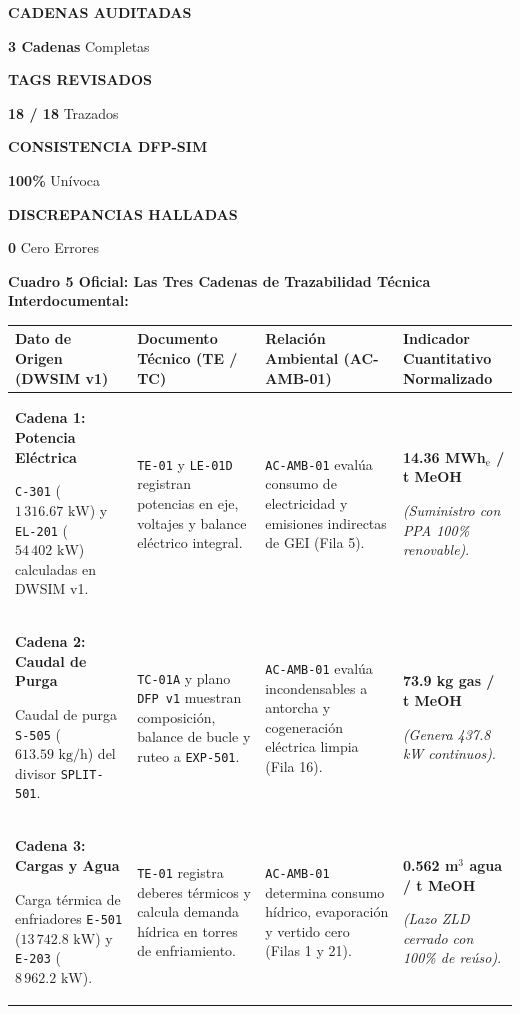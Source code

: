 \documentclass[10pt,landscape]{article}
\newcommand{\metriccard}[4]{%
  \begin{tcolorbox}[
    width=#1,
    colback=white,
    colframe=#3!70!black,
    arc=1.8mm,
    boxrule=0.8pt,
    top=3pt,
    bottom=3pt,
    left=4pt,
    right=4pt,
    nobeforeafter
  ]
    \centering
    {\fontsize{6.0pt}{7.2pt}\selectfont \textbf{\color{navyblue}#2}}\par
    \vspace{1.5pt}
    {\color{#3}#4}
  \end{tcolorbox}%
}
\begin{document}
\noindent
\begin{minipage}{\textwidth}
  \centering
  \metriccard{0.235\textwidth}{CADENAS AUDITADAS}{navyblue}{\textbf{\Huge 3 Cadenas} Completas} \hfill
  \metriccard{0.235\textwidth}{TAGS REVISADOS}{emeraldgreen}{\textbf{\Huge 18 / 18} Trazados} \hfill
  \metriccard{0.235\textwidth}{CONSISTENCIA DFP-SIM}{emeraldgreen}{\textbf{\Huge 100\%} Unívoca} \hfill
  \metriccard{0.235\textwidth}{DISCREPANCIAS HALLADAS}{emeraldgreen}{\textbf{\Huge 0} Cero Errores}
\end{minipage}

\vspace{2.5pt}

\noindent\textbf{\fontsize{8.2pt}{9.5pt}\selectfont \color{navyblue}Cuadro 5 Oficial: Las Tres Cadenas de Trazabilidad Técnica Interdocumental:}\par\vspace{1pt}

\scriptsize
\renewcommand{\arraystretch}{1.22}
\begin{tabularx}{\textwidth}{p{3.6cm} p{3.8cm} p{4.6cm} X}
  \toprule
  \rowcolor{tableheader}
  \textbf{\color{white}Dato de Origen (DWSIM v1)} & \textbf{\color{white}Documento Técnico (TE / TC)} & \textbf{\color{white}Relación Ambiental (AC-AMB-01)} & \textbf{\color{white}Indicador Cuantitativo Normalizado} \\
  \midrule
  \rowcolor{roweven}
  \textbf{\color{navyblue}Cadena 1: Potencia Eléctrica}\par
  \texttt{C-301} ($1\,316.67\text{ kW}$) y \texttt{EL-201} ($54\,402\text{ kW}$) calculadas en DWSIM v1. &
  \texttt{TE-01} y \texttt{LE-01D} registran potencias en eje, voltajes y balance eléctrico integral. &
  \texttt{AC-AMB-01} evalúa consumo de electricidad y emisiones indirectas de GEI (Fila 5). &
  \textbf{\Large 14.36 MWh$_{\text{e}}$ / t MeOH}\par
  \textit{(Suministro con PPA 100\% renovable)}. \\
  \midrule
  \rowcolor{rowodd}
  \textbf{\color{navyblue}Cadena 2: Caudal de Purga}\par
  Caudal de purga \texttt{S-505} ($613.59\text{ kg/h}$) del divisor \texttt{SPLIT-501}. &
  \texttt{TC-01A} y plano \texttt{DFP v1} muestran composición, balance de bucle y ruteo a \texttt{EXP-501}. &
  \texttt{AC-AMB-01} evalúa incondensables a antorcha y cogeneración eléctrica limpia (Fila 16). &
  \textbf{\Large 73.9 kg gas / t MeOH}\par
  \textit{(Genera 437.8 kW continuos)}. \\
  \midrule
  \rowcolor{roweven}
  \textbf{\color{navyblue}Cadena 3: Cargas y Agua}\par
  Carga térmica de enfriadores \texttt{E-501} ($13\,742.8\text{ kW}$) y \texttt{E-203} ($8\,962.2\text{ kW}$). &
  \texttt{TE-01} registra deberes térmicos y calcula demanda hídrica en torres de enfriamiento. &
  \texttt{AC-AMB-01} determina consumo hídrico, evaporación y vertido cero (Filas 1 y 21). &
  \textbf{\Large 0.562 m$^3$ agua / t MeOH}\par
  \textit{(Lazo ZLD cerrado con 100\% de reúso)}. \\
  \bottomrule
\end{tabularx}
\end{document}

